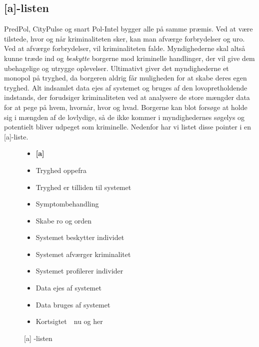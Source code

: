 \subsection*{[a]-listen}
PredPol, CityPulse og snart Pol-Intel bygger alle på samme præmis. Ved at være tilstede, hvor og når kriminaliteten sker, kan man afværge forbrydelser og uro. Ved at afværge forbrydelser, vil kriminaliteten falde. Myndighederne skal altså kunne træde ind og \textit{beskytte} borgerne mod kriminelle handlinger, der vil give dem ubehagelige og utrygge oplevelser. %
Ultimativt giver det myndighederne et monopol på tryghed, da borgeren aldrig får muligheden for at skabe deres egen tryghed. Alt indsamlet data ejes af systemet og bruges af den lovopretholdende indstands, der forudsiger kriminaliteten ved at analysere de store mængder data for at pege på hvem, hvornår, hvor og hvad. %
Borgerne kan blot forsøge at holde sig i mængden af de lovlydige, så de ikke kommer i myndighedernes søgelys og potentielt bliver udpeget som kriminelle. Nedenfor har vi listet disse pointer i en [a]-liste.

\begin{figure}[H]
        \begin{itemize}
            \item[] \textbf{[a]}
            \item Tryghed oppefra
            \item Tryghed er tilliden til systemet
            \item Symptombehandling
            \item Skabe ro og orden
            \item Systemet beskytter individet
            \item Systemet afværger kriminalitet
            \item Systemet profilerer individer
            \item Data ejes af systemet
            \item Data bruges af systemet
            \item Kortsigtet~\textrightarrow~nu og her
        \end{itemize}

    \caption{[a]
    -listen}
    \label{fig:a_liste}
\end{figure}


